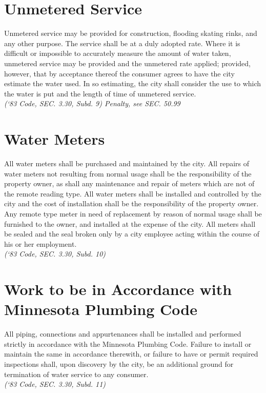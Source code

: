 \section{Unmetered Service}
Unmetered service may be provided for construction, flooding skating rinks, and any other purpose.  The service shall be at a duly adopted rate.  Where it is difficult or impossible to accurately measure the amount of water taken, unmetered service may be provided and the unmetered rate applied; provided, however, that by acceptance thereof the consumer agrees to have the city estimate the water used.  In so estimating, the city shall consider the use to which the water is put and the length of time of unmetered service.\\
\emph{(‘83 Code, SEC. 3.30, Subd. 9) Penalty, see SEC. 50.99}
\section{Water Meters}
All water meters shall be purchased and maintained by the city.  All repairs of water meters not resulting from normal usage shall be the responsibility of the property owner, as shall any maintenance and repair of meters which are not of the remote reading type.  All water meters shall be installed and controlled by the city and the cost of installation shall be the responsibility of the property owner.  Any remote type meter in need of replacement by reason of normal usage shall be furnished to the owner, and installed at the expense of the city.  All meters shall be sealed and the seal broken only by a city employee acting within the course of his or her employment.\\
\emph{(‘83 Code, SEC. 3.30, Subd. 10)}
\section{Work to be in Accordance with Minnesota Plumbing Code}
All piping, connections and appurtenances shall be installed and performed strictly in accordance with the Minnesota Plumbing Code.  Failure to install or maintain the same in accordance therewith, or failure to have or permit required inspections shall, upon discovery by the city, be an additional ground for termination of water service to any consumer.\\
\emph{(‘83 Code, SEC. 3.30, Subd. 11)}
